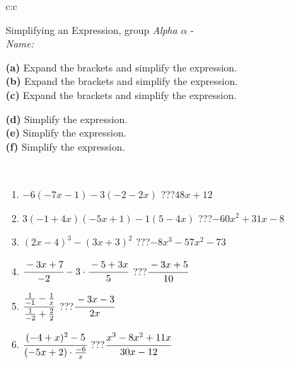 \documentclass[10pt]{report}
\begin{document}
\thispagestyle{empty}
\begin{tabular}{c:c}
\begin{minipage}[c][104.5mm][t]{0.5\linewidth}
\begin{center}
\vspace{7mm}
{\huge Simplifying an Expression, group \textit{Alpha $\alpha$} -}\\[5mm]
\textit{Name:}\phantom{xxxxxxxxxxxxxxxxxxxxxxxxxxxxxxxxxxxxxxxxxxxxxxxxxxxxxxxxxxxxxxxxx}\\[5mm]
\begin{minipage}{0.95\linewidth}
\begin{center}
{\small \begin{minipage}{0.6\textwidth}
\textbf{(a)} Expand the brackets and simplify the expression. \\[1mm]
\textbf{(b)} Expand the brackets and simplify the expression. \\[1mm]
\textbf{(c)} Expand the brackets and simplify the expression.
\end{minipage} \begin{minipage}{0.39\textwidth}
\textbf{(d)} Simplify the expression. \\[1mm]
\textbf{(e)} Simplify the expression. \\[1mm]
\textbf{(f)} Simplify the expression.
\end{minipage}
}
\end{center}
\end{minipage}
\\[4mm]
\begin{minipage}{0.79\linewidth}
\begin{center}
\begin{varwidth}{\linewidth}
\begin{enumerate}
\normalsize
\item $-6(-7x-1)-3(-2-2x)$\quad \dotfill\; ???\;\dotfill \quad $48x+12$
\item $3(-1+4x)(-5x+1)-1(5-4x)$\quad \dotfill\; ???\;\dotfill \quad $-60x^2+31x-8$
\item $(2x-4)^3-(3x+3)^2$\quad \dotfill\; ???\;\dotfill \quad $-8x^3-57x^2-73$
\item $\cfrac{-3x+7}{-2}-3\cdot\cfrac{-5+3x}{5}$\quad \dotfill\; ???\;\dotfill \quad $\cfrac{-3x+5}{10}$
\item $\cfrac{\frac{1}{-1}-\frac{1}{x}}{\frac{1}{-2}+\frac{2}{2}}$\quad \dotfill\; ???\;\dotfill \quad $\cfrac{-3x-3}{2x}$
\item $\cfrac{(-4+x)^2-5}{(-5x+2)\cdot\frac{-6}{x}}$\quad \dotfill\; ???\;\dotfill \quad $\cfrac{x^3-8x^2+11x}{30x-12}$

\end{enumerate}
\end{varwidth}
\end{center}
\end{minipage}
\end{center}
\end{minipage}
\end{tabular}
\end{document}
